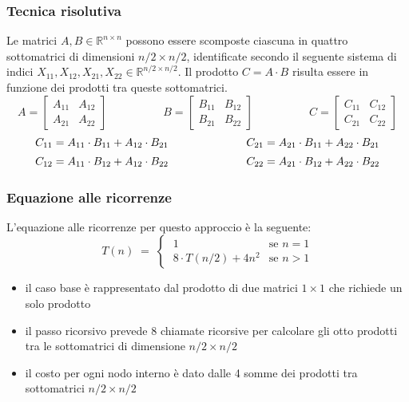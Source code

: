 \subsubsection*{Tecnica risolutiva}
Le matrici \(A, B \in \mathbb{R}^{n \times n}\) possono essere scomposte ciascuna in quattro sottomatrici di dimensioni
\(n/2 \times n/2\), identificate secondo il seguente sistema di indici \(X_{11}, X_{12}, X_{21}, X_{22} \in \mathbb{R}^{n/2 \times n/2}\).
Il prodotto \(C = A \cdot B\) risulta essere in funzione dei prodotti tra queste sottomatrici.
\[A = \begin{bmatrix}
	A_{11} & A_{12} \\ A_{21} & A_{22}
\end{bmatrix} \qquad\qquad\quad B = \begin{bmatrix}
	B_{11} & B_{12} \\ B_{21} & B_{22}
\end{bmatrix} \qquad\qquad\quad C = \begin{bmatrix}
	C_{11} & C_{12} \\ C_{21} & C_{22}
\end{bmatrix}\]
\[\begin{array}{c c}
	C_{11} = A_{11} \cdot B_{11} + A_{12} \cdot B_{21} \qquad\quad & \qquad\quad C_{21} = A_{21} \cdot B_{11} + A_{22} \cdot B_{21} \\[5pt]
	C_{12} = A_{11} \cdot B_{12} + A_{12} \cdot B_{22} \qquad\quad & \qquad\quad C_{22} = A_{21} \cdot B_{12} + A_{22} \cdot B_{22}
\end{array}\]

\subsubsection*{Equazione alle ricorrenze}
L'equazione alle ricorrenze per questo approccio è la seguente:
\[T(n) \; = \; \begin{cases}
	\; 1 & \text{se } n = 1 \\[3pt]
	\; 8 \cdot T(n/2) + 4 n^2 & \text{se } n > 1
\end{cases}\]
\begin{itemize}
	\item il caso base è rappresentato dal prodotto di due matrici \(1 \times 1\) che richiede un solo prodotto
	\item il passo ricorsivo prevede 8 chiamate ricorsive per calcolare gli otto prodotti tra le sottomatrici di dimensione \(n/2 \times n/2\)
	\item il costo per ogni nodo interno è dato dalle 4 somme dei prodotti tra sottomatrici \(n/2 \times n/2\)
\end{itemize}

